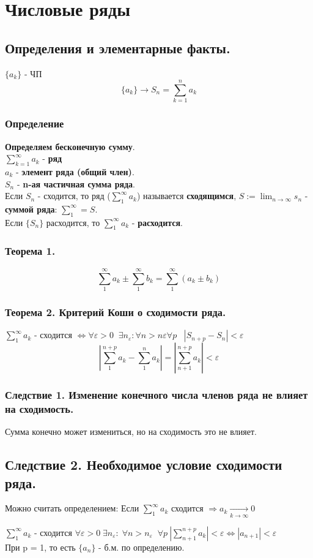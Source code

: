 \documentclass[12pt, a4paper]{article}
\newcommand{\eps}{\varepsilon}
\begin{document}
\section{Числовые ряды}
\subsection{Определения и элементарные факты.}
$ \{a_k\} $ - ЧП
\[ \{a_k\} \to S_n = \sum^n_{k=1}a_k \]
\subsubsection{Определение}
\begin{tcolorbox}
    \textbf{Определяем бесконечную сумму}.\\
    $\sum^\infty_{k=1} a_k$ - \textbf{ряд}\\
    $a_k$ - \textbf{элемент ряда (общий член)}.\\
    $S_n$ - \textbf{n-ая частичная сумма ряда}.\\
    Если $S_n$ - сходится, то ряд ($\sum^\infty_{1} a_k$) называется \textbf{сходящимся}, $S:=\lim_{n\to\infty} s_n$ - \textbf{суммой ряда}: $\sum_1^\infty = S$.\\
    Если $\{S_n\}$ расходится, то $\sum^\infty_{1} a_k$ - \textbf{расходится}.
\end{tcolorbox}
\subsubsection{\textbf{Теорема 1.}}
\[ \sum_1^\infty a_k \pm \sum_1^\infty b_k = \sum_1^\infty (a_k \pm b_k) \]
\subsubsection{\textbf{Теорема 2. Критерий Коши о сходимости ряда.}}
$ \sum_1^\infty a_k$ - сходится $\Leftrightarrow \forall \eps > 0\;\; \exists n_\eps : \forall n > n\eps \forall p \;\;\; |S_{n+p} - S_n| < \eps $
\[ |\sum_1^{n+p} a_k - \sum_1^n a_k| = |\sum_{n+1}^{n+p} a_k| < \eps \]
\subsubsection{\textbf{Следствие 1. Изменение конечного числа членов ряда не влияет на сходимость.}}
Сумма конечно может измениться, но на сходимость это не влияет.
\subsection{\textbf{Следствие 2. Необходимое условие сходимости ряда.}}
Можно считать определением: Если $\sum_1^\infty a_k$ сходится $\Rightarrow a_k \xrightarrow[k\to\infty]{} 0$\\
\begin{tcolorbox}[title=Доказательство]
    $\sum_1^\infty a_k$ - сходится $\forall \eps > 0\; \exists n_\eps:\; \forall n > n_\eps\;\; \forall p \ |\sum_{n+1}^{n+p} a_k| < \eps \Leftrightarrow |a_{n+1}| < \eps$\\
    При p = 1, то есть $\{a_n\}$ - б.м. по определению.
\end{tcolorbox}
\end{document}
